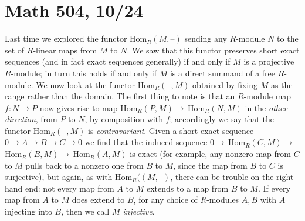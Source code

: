 \documentclass[10pt]{article}
\begin{document}
\section*{Math 504, 10/24}

Last time we explored the functor Hom$_R(M,\text{--})$ sending any
$R$-module $N$ to the set of $R$-linear maps from $M$ to $N$. We saw
that this functor preserves short exact sequences (and in fact exact
sequences generally) if and only if $M$ is a projective $R$-module; in
turn this holds if and only if $M$ is a direct summand of a free
$R$-module. We now look at the functor Hom$_R(\text{--},M)$ obtained by
fixing $M$ as the range rather than the domain. The first thing to note
is that an $R$-module map $f:N\rightarrow P$ now gives rise to map
Hom$_R(P,M)\rightarrow\,$Hom$_R(N,M)$ in the {\sl other direction},
from $P$ to $N$, by composition with $f$; accordingly we say that the
functor Hom$_R(\text{--},M)$ is {\sl contravariant}. Given a short exact
sequence $0\rightarrow A\rightarrow B\rightarrow C\rightarrow 0$ we find
that the induced sequence
$0\rightarrow\,$Hom$_R(C,M)\rightarrow\,$Hom$_R(B,M)\rightarrow\,$Hom$_R(A,M)$
is exact (for example, any nonzero map from $C$ to $M$ pulls back to a
nonzero one from $B$ to $M$, since the map from $B$ to $C$ is
surjective), but again, as with Hom$_R((M,\text{--})$, there can be
trouble on the right-hand end: not every map from $A$ to $M$ extends to
a map from $B$ to $M$. If every map from $A$ to $M$ does extend to $B$,
for any choice of $R$-modules $A,B$ with $A$ injecting into $B$, then we
call $M$ {\sl injective}.
\end{document}
